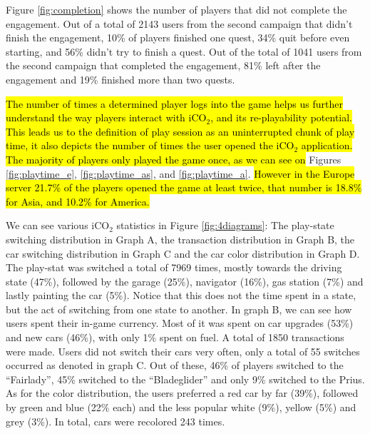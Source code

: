 \documentclass[preprint,authoryear,12pt]{elsarticle}
\newcommand{\hlc}[2][yellow]{ {\sethlcolor{#1} \hl{#2}} }
\begin{document}
Figure \ref{fig:completion} shows the number of players that did not complete the engagement. Out of a total of 2143 users from the second campaign that didn't finish the engagement, 10\% of players finished one quest, 34\% quit before even starting, and 56\% didn't try to finish a quest. Out of the total of 1041 users from the second campaign that completed the engagement, 81\% left after the engagement and 19\% finished more than two quests.


\hlc[green]
{The number of times a determined player logs into the game helps us further understand the way players interact with iCO$_2$, and its re-playability potential. This leads us to the definition of play session as an uninterrupted chunk of play time, it also depicts the number of times the user opened the iCO$_2$ application. The majority of players only played the game once, as we can see on }Figures \ref{fig:playtime_e}, \ref{fig:playtime_as}, and \ref{fig:playtime_a}. 
\hlc[green]{However in the Europe server 21.7\% of the players opened the  game at least twice, that number is 18.8\% for Asia, and 10.2\% for America.}





We can see various iCO$_2$ statistics in Figure \ref{fig:4diagrams}: The play-state switching distribution in Graph A, the transaction distribution in Graph B, the car switching distribution in Graph C and the car color distribution in Graph D. The play-stat was switched a total of 7969 times, mostly towards the driving state (47\%), followed by the garage (25\%), navigator (16\%), gas station (7\%) and lastly painting the car (5\%). Notice that this does not the time spent in a state, but the act of switching from one state to another. In graph B, we can see how users spent their in-game currency. Most of it was spent on car upgrades (53\%) and new cars (46\%), with only 1\% spent on fuel. A total of 1850 transactions were made. Users did not switch their cars very often, only a total of 55 switches occurred as denoted in graph C. Out of these, 46\% of players switched to the ``Fairlady'', 45\% switched to the ``Bladeglider'' and only 9\% switched to the Prius. As for the color distribution, the users preferred a red car by far (39\%), followed by green and blue (22\% each) and the less popular white (9\%), yellow (5\%) and grey (3\%). In total, cars were recolored 243 times.
\end{document}
